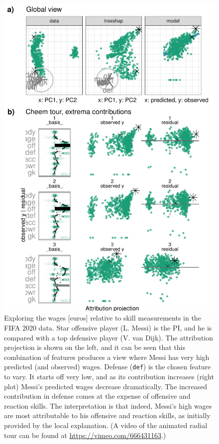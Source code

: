 \documentclass[11pt,twoside]{article}
\begin{document}
\begin{figure}

{\centering \includegraphics[width=0.9\linewidth]{./figures/case_fifa} 

}

\caption{Exploring the wages {[}euros{]} relative to skill measurements in the FIFA 2020 data. Star offensive player (L. Messi) is the PI, and he is compared with a top defensive player (V. van Dijk). The attribution projection is shown on the left, and it can be seen that this combination of features produces a view where Messi has very high predicted (and observed) wages. Defense (\texttt{def}) is the chosen feature to vary. It starts off very low, and as its contribution increases (right plot) Messi's predicted wages decrease dramatically. The increased contribution in defense comes at the expense of offensive and reaction skills. The interpretation is that indeed, Messi's high wages are most attributable to his offensive and reaction skills, as initially provided by the local explanation. (A video of the animated radial tour can be found at \url{https://vimeo.com/666431163}.)}\label{fig:casefifa}
\end{figure}
\end{document}

